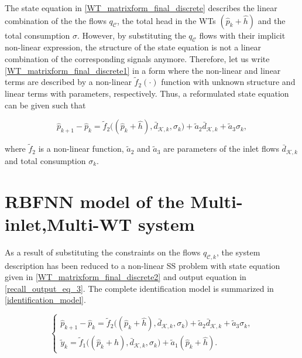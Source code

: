 The state equation in \eqref{WT_matrixform_final_discrete} describes the linear combination of the the flows $q_\mathcal{C}$, the total head in the WTs $(\hat{p}_k + \hat{h})$ and the total consumption $\sigma$. However, by substituting the $q_\mathcal{C}$ flows with their implicit non-linear expression, the structure of the state equation is not a linear combination of the corresponding signals anymore. Therefore, let us write \eqref{WT_matrixform_final_discrete1} in a form where the non-linear and linear terms are described by a non-linear $\tilde{f}_2(\cdot)$ function with unknown structure and linear terms with parameters, respectively. Thus, a reformulated state equation can be given such that

 \begin{equation}
  \label{WT_matrixform_final_discrete2}
     \hat{p}_{k+1} - \hat{p}_k = \tilde{f}_2 \big((\hat{p}_k + \hat{h}),\bar{d}_{\mathcal{K},k}, \sigma_k\big) + \tilde{a}_2 \bar{d}_{\mathcal{K},k} + \tilde{a}_3 \sigma_k,
\end{equation} 


where $\tilde{f}_2$ is a non-linear function, $\tilde{a}_2$ and $\tilde{a}_3$ are parameters of the inlet flows $\bar{d}_{\mathcal{K},k}$ and total consumption $\sigma_k$. 


\section{RBFNN model of the Multi-inlet,Multi-WT system}
\label{RBFNN_model_multi_inlet_multi_WT_sys} 

As a result of substituting the constraints on the flows $q_{\mathcal{C},k}$, the system description has been reduced to a non-linear SS problem with state equation given in \eqref {WT_matrixform_final_discrete2} and output equation in \eqref {recall_output_eq_3}. The complete identification model is summarized in \eqref{identification_model}. 

\begin{equation}
\begin{cases}
  \label{identification_model}
    \hat{p}_{k+1} - \hat{p}_k = \tilde{f}_2 \big((\hat{p}_k + \hat{h}),\bar{d}_{\mathcal{K},k}, \sigma_k\big) + \tilde{a}_2 \bar{d}_{\mathcal{K},k} + \tilde{a}_3 \sigma_k,\\
  \tilde{y}_k  = \tilde{f}_1 \big((\hat{p}_k + \hat{h}),\bar{d}_{\mathcal{K},k}, \sigma_k\big) + \tilde{a}_1 (\hat{p}_k + \hat{h}).
  \end{cases}
\end{equation} 

